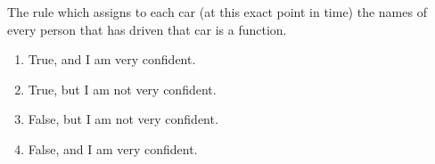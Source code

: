 \bigskip


\item The rule which assigns to each car (at this exact point in time) the names of every person that has driven that car is a function.

\begin{enumerate}
\item True, and I am very confident.
\item True, but I am not very confident.
\item False, but I am not very confident.
\item False, and I am very confident.
\end{enumerate}


